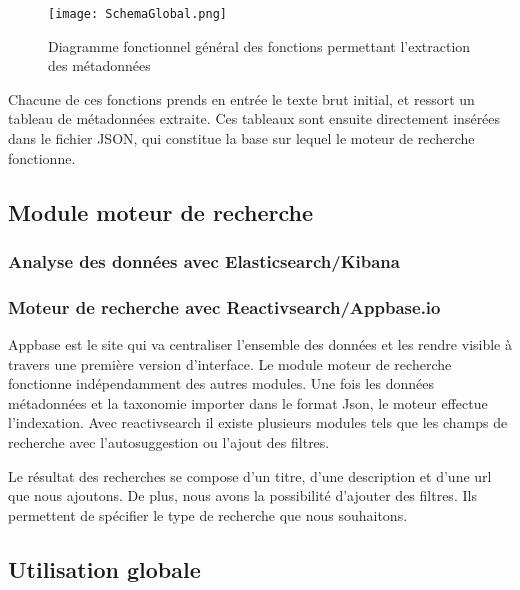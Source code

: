 \begin{figure}[h!]
  \centering
	\texttt{[image: SchemaGlobal.png]}
	\caption[]{Diagramme fonctionnel général des fonctions permettant l'extraction des métadonnées}
  \label{fig:globalMeta}
\end{figure}

Chacune de ces fonctions prends en entrée le texte brut initial, et ressort un tableau de métadonnées extraite.
Ces tableaux sont ensuite directement insérées dans le fichier JSON, qui constitue la base sur lequel le moteur de recherche fonctionne.


\subsection{Module moteur de recherche}
\subsubsection{Analyse des données avec Elasticsearch/Kibana}


\subsubsection{Moteur de recherche avec Reactivsearch/Appbase.io}
Appbase est le site qui va centraliser l'ensemble des données et les rendre visible à travers une première version d'interface.
Le module moteur de recherche fonctionne indépendamment des autres modules. Une fois les données métadonnées et la taxonomie importer dans le format Json, le moteur effectue l'indexation.
Avec reactivsearch il existe plusieurs modules tels que les champs de recherche avec l'autosuggestion ou l'ajout des filtres.  

Le résultat des recherches se compose d'un titre, d'une description et d'une url que nous ajoutons. De plus, nous avons la possibilité d'ajouter des filtres.
Ils permettent de spécifier le type de recherche que nous souhaitons.


\subsection {Utilisation globale}

